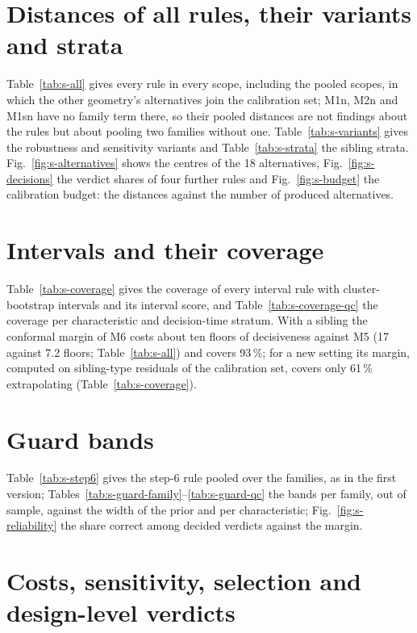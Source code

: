 \documentclass[pdflatex,sn-basic]{sn-jnl}
\begin{document}
\section{Distances of all rules, their variants and strata}

Table~\ref{tab:s-all} gives every rule in every scope, including the pooled scopes, in which the other geometry's alternatives join the calibration set; M1n, M2n and M1sn have no family term there, so their pooled distances are not findings about the rules but about pooling two families without one. Table~\ref{tab:s-variants} gives the robustness and sensitivity variants and Table~\ref{tab:s-strata} the sibling strata. Fig.~\ref{fig:s-alternatives} shows the centres of the 18 alternatives, Fig.~\ref{fig:s-decisions} the verdict shares of four further rules and Fig.~\ref{fig:s-budget} the calibration budget: the distances against the number of produced alternatives.

\section{Intervals and their coverage}

Table~\ref{tab:s-coverage} gives the coverage of every interval rule with cluster-bootstrap intervals and its interval score, and Table~\ref{tab:s-coverage-qc} the coverage per characteristic and decision-time stratum. With a sibling the conformal margin of M6 costs about ten floors of decisiveness against M5 (17 against 7.2 floors; Table~\ref{tab:s-all}) and covers 93\,\%; for a new setting its margin, computed on sibling-type residuals of the calibration set, covers only 61\,\% extrapolating (Table~\ref{tab:s-coverage}).

\section{Guard bands}

Table~\ref{tab:s-step6} gives the step-6 rule pooled over the families, as in the first version; Tables~\ref{tab:s-guard-family}--\ref{tab:s-guard-qc} the bands per family, out of sample, against the width of the prior and per characteristic; Fig.~\ref{fig:s-reliability} the share correct among decided verdicts against the margin.

\section{Costs, sensitivity, selection and design-level verdicts}
\end{document}

